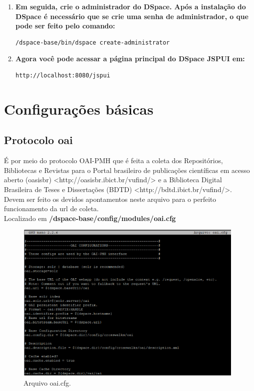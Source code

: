 \documentclass[12pt,hidelinks]{article}
\begin{document}
\begin{enumerate}
        \item \textbf{Em seguida, crie o administrador do DSpace. Após a instalação do DSpace é necessário que se crie uma senha de administrador, o que pode ser feito pelo comando:}\\
        
            \begin{verbatim}
/dspace-base/bin/dspace create-administrator
            \end{verbatim}
            
        \item \textbf{Agora você pode acessar a página principal do DSpace JSPUI em:}\\
        
        \begin{verbatim}
http://localhost:8080/jspui
            \end{verbatim}

\end{enumerate}

\newpage
\section{Configurações básicas}
\newpage
      \subsection{Protocolo oai}
 
      É por meio do protocolo OAI-PMH que é feita a coleta dos Repositórios, Bibliotecas e Revistas para o Portal brasileiro de publicações científicas em acesso aberto (oasisbr) <http://oasisbr.ibict.br/vufind/>  e a Biblioteca Digital Brasileira de Teses e Dissertações (BDTD) <http://bdtd.ibict.br/vufind/>. Devem ser feito os devidos apontamentos neste arquivo para o perfeito funcionamento da url de coleta.\\
      
      Localizado em \textbf{/dspace-base/config/modules/oai.cfg} 

          \begin{figure}[!htp]
                \centering
                \includegraphics[scale=0.9]{figura/oai.png}
                \caption{Arquivo oai.cfg.}
            \label{Rotulo}
          \end{figure}
        
\end{document}
